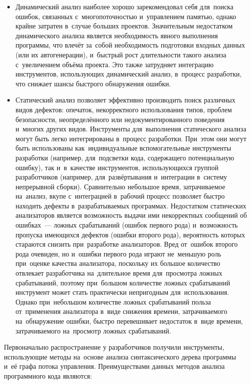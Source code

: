 \begin{itemize}
 \item Динамический анализ наиболее хорошо зарекомендовал себя для~поиска ошибок, связанных с~многопоточностью и~управлением памятью, однако крайне затратен в~случае больших проектов. Значительным недостатком динамического анализа является необходимость явного выполнения программы, что влечёт за~собой необходимость подготовки входных данных (или их автогенерации), и~быстрый рост длительности такого анализа с~увеличением объёма проекта. Это также затрудняет интеграцию инструментов, использующих динамический анализ, в~процесс разработки, что снижает шансы быстрого обнаружения ошибки.
 \item Статический анализ позволяет эффективно производить поиск различных видов дефектов: опечаток, некорректного использования типов, проблем безопасности, неопределённого или недокументированного поведения и~многих других видов. Инструменты для~выполнения статического анализа могут быть легко интегрированы в~процесс разработки. При~этом они могут быть использованы как~индивидуальные вспомогательные инструменты разработки (например, для~подсветки кода, содержащего потенциальную ошибку), так и~в~качестве инструментов, использующихся группой разработчиков (например, для~развёртывания и~интеграции в~систему непрерывной сборки). Сравнительно небольшое время, затрачиваемое на~анализ, вкупе с~интеграцией в~рабочий процесс позволяет быстро находить дефекты в~разрабатываемых программах. Недостатком статических анализаторов является возможность выдачи ими некорректных сообщений об ошибках~--- ложных срабатываний (ошибок первого рода) и~возможность пропуска имеющихся дефектов (ошибки второго рода), вероятность которых стараются снизить при~разработке анализаторов. Вред от~ошибок второго рода очевиден, но и~ошибки первого рода играют не~меньшую роль при~оценке качества анализатора, поскольку их большое количество отвлекает разработчика на~длительное время для~просмотра ложных срабатываний, поэтому при~большом количестве ложных срабатываний инструмент может стать практически непригодным для~использования. Однако при~небольшом количестве ложных срабатываний польза от~применения анализатора в~виде снижения времени, затрачиваемого на~обнаружение ошибки, быстро перевешивает недостаток в~виде времени, затрачиваемого на~просмотр ложных срабатываний.
\end{itemize}

Первоначально распространение у разработчиков получили инструменты, использующие методы на~основе анализа синтаксического дерева программы и~её графа потока управления. Преимуществами данных методов анализа программного кода являются:

